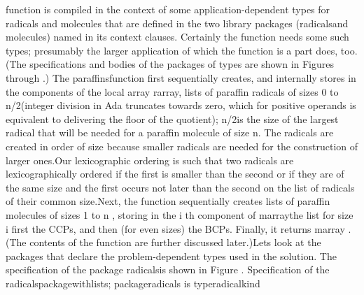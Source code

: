 function is compiled in the context of some application-dependent
types for radicals and molecules that are defined in the two library
packages (\tyxffmxmono[]radicals\tyxffmxendmono[] and %
\tyxffmxmono[]molecules\tyxffmxendmono[]) named in its context clauses.
Certainly the function needs some such types; presumably the larger
application of which the function is a part does, too. (The specifications
and bodies of the packages of types are shown in Figures 
through .) The %
\tyxffmxmono[]paraffins\tyxffmxendmono[] function first sequentially
creates, and internally stores in the components of the local array
\tyxffmxmono[]r\Symuns[]array\tyxffmxendmono[], lists of paraffin
radicals of sizes 0 to \tyxffmxmono[]n/2\tyxffmxendmono[] (integer
division in Ada truncates towards zero, which for positive operands
is equivalent to delivering the floor of the quotient); %
\tyxffmxmono[]n/2\tyxffmxendmono[] is the size of the largest radical
that will be needed for a paraffin molecule of size %
\tyxffmxmono[]n\tyxffmxendmono[]. The radicals are created in order
of size because smaller radicals are needed for the construction of
larger ones.\NtFoot[]\NtNtpar[]Our lexicographic ordering is such
that two radicals are lexicographically ordered if the first is smaller
than the second or if they are of the same size and the first occurs
not later than the second on the list of radicals of their common
size.\NtEndntpar[]\NtEndfoot[] Next, the function sequentially creates
lists of paraffin molecules of sizes 1 to \tyxffmxmono[]n%
\tyxffmxendmono[], storing in the \InlEqn[]\LmthEqn[]i
\LmthEndeqn[]\EndInlEqn[]th component
of \tyxffmxmono[]m\Symuns[]array\tyxffmxendmono[] the list for size
\InlEqn[]\LmthEqn[]i
\LmthEndeqn[]\EndInlEqn[]\EmDash[]first the CCPs, and then (for even sizes)
the BCPs. Finally, it returns \tyxffmxmono[]m\Symuns[]array%
\tyxffmxendmono[]. (The contents of the function are further discussed
later.)\Endpara[]
\Para[]Let\rsquo[]s look at the packages that declare the problem-dependent
types used in the solution. The specification of the package %
\tyxffmxmono[]radicals\tyxffmxendmono[] is shown in Figure %
.
\Parbox[]
Specification of the %
\tyxffmxmono[]radicals\tyxffmxendmono[] package\FgEndcap[]
\Comp[]\tyxtstxbf[]with\tyxtstxendbf[] lists;
\tyxtstxbf[]package\tyxtstxendbf[] radicals \tyxtstxbf[]is%
\tyxtstxendbf[]
   \tyxtstxbf[]type\tyxtstxendbf[] radical\Symuns[]kind %
